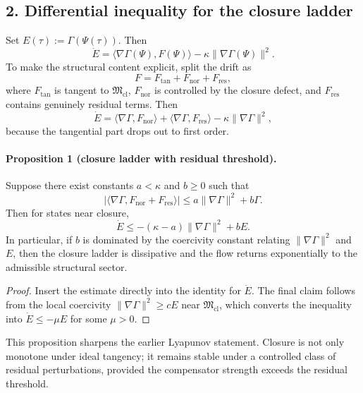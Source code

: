 \documentclass[12pt,a4paper]{article}
\begin{document}
\subsection*{2. Differential inequality for the closure ladder}
Set $E(\tau):=\Gamma(\Psi(\tau))$. Then
\[
\dot E = \langle \nabla\Gamma(\Psi),F(\Psi)\rangle - \kappa\|\nabla\Gamma(\Psi)\|^2.
\]
To make the structural content explicit, split the drift as
\[
F = F_{\mathrm{tan}} + F_{\mathrm{nor}} + F_{\mathrm{res}},
\]
where $F_{\mathrm{tan}}$ is tangent to $\mathfrak M_{\mathrm{cl}}$, $F_{\mathrm{nor}}$ is
controlled by the closure defect, and $F_{\mathrm{res}}$ contains genuinely residual
terms. Then
\[
\dot E
= \langle \nabla\Gamma,F_{\mathrm{nor}}\rangle
 + \langle \nabla\Gamma,F_{\mathrm{res}}\rangle
 - \kappa\|\nabla\Gamma\|^2,
\]
because the tangential part drops out to first order.

\paragraph{Proposition 1 (closure ladder with residual threshold).}
Suppose there exist constants $a<\kappa$ and $b\ge 0$ such that
\[
|\langle \nabla\Gamma,F_{\mathrm{nor}}+F_{\mathrm{res}}\rangle|
\le a\|\nabla\Gamma\|^2 + b\Gamma.
\]
Then for states near closure,
\[
\dot E \le -(\kappa-a)\|\nabla\Gamma\|^2 + bE.
\]
In particular, if $b$ is dominated by the coercivity constant relating
$\|\nabla\Gamma\|^2$ and $E$, then the closure ladder is dissipative and the flow
returns exponentially to the admissible structural sector.

\begin{proof}
Insert the estimate directly into the identity for $\dot E$. The final claim
follows from the local coercivity
$\|\nabla\Gamma\|^2\ge cE$ near $\mathfrak M_{\mathrm{cl}}$, which converts the
inequality into $\dot E\le -\mu E$ for some $\mu>0$.
\end{proof}

This proposition sharpens the earlier Lyapunov statement. Closure is not only
monotone under ideal tangency; it remains stable under a controlled class of
residual perturbations, provided the compensator strength exceeds the residual
threshold.
\end{document}
